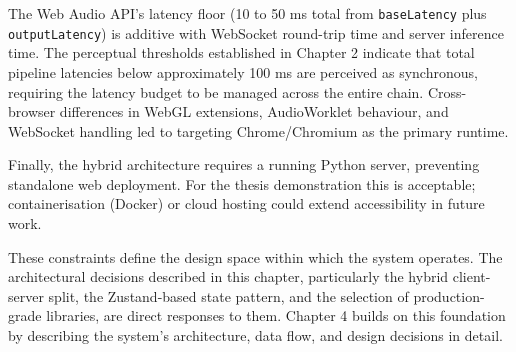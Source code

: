 The Web Audio API's latency floor (10 to 50 ms total from \texttt{baseLatency} plus \texttt{outputLatency}) is additive with WebSocket round-trip time and server inference time. The perceptual thresholds established in Chapter 2 indicate that total pipeline latencies below approximately 100 ms are perceived as synchronous, requiring the latency budget to be managed across the entire chain. Cross-browser differences in WebGL extensions, AudioWorklet behaviour, and WebSocket handling led to targeting Chrome/Chromium as the primary runtime.

Finally, the hybrid architecture requires a running Python server, preventing standalone web deployment. For the thesis demonstration this is acceptable; containerisation (Docker) or cloud hosting could extend accessibility in future work.

These constraints define the design space within which the system operates. The architectural decisions described in this chapter, particularly the hybrid client-server split, the Zustand-based state pattern, and the selection of production-grade libraries, are direct responses to them. Chapter 4 builds on this foundation by describing the system's architecture, data flow, and design decisions in detail.
